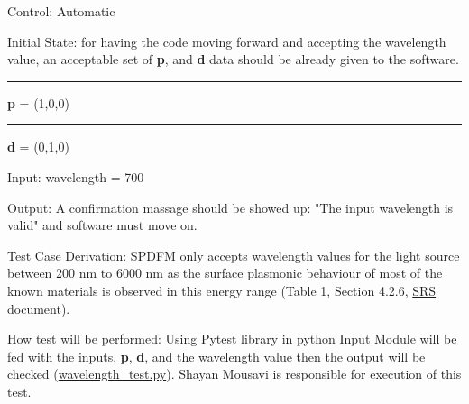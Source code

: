 \documentclass[12pt, titlepage]{article}
\begin{document}
\begin{enumerate}
Control: Automatic

Initial State: for having the code moving forward and accepting the wavelength value, an acceptable set of \textbf{p}, and \textbf{d} data should be already given to the software.\\ 
\rule{2.3cm}{0pt} \textbf{p} = (1,0,0)\\
\rule{2.3cm}{0pt} \textbf{d} = (0,1,0)

Input: wavelength = 700

Output: A confirmation massage should be showed up: "The input wavelength is valid" and software must move on.

Test Case Derivation: SPDFM only accepts wavelength values for the light source between 200 nm to 6000 nm as the surface plasmonic behaviour of most of the known materials is observed in this energy range (Table 1, Section 4.2.6, \href{https://github.com/shmouses/SPDFM/tree/master/doc/SRS}{SRS} document). 

How test will be performed: Using Pytest library in python Input Module will be fed with the inputs, \textbf{p}, \textbf{d}, and the wavelength value then the output will be checked (\href{https://github.com/shmouses/SPDFM/tree/master/src}{wavelength\_test.py}). Shayan Mousavi is responsible for execution of this test. 
\\
\\
\end{enumerate}
\end{document}
